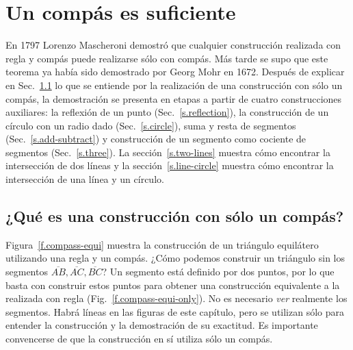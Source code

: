 
\chapter{Un compás es suficiente}\label{c.compass}


En 1797 Lorenzo Mascheroni demostró que cualquier construcción realizada con regla y compás puede realizarse sólo con compás. Más tarde se supo que este teorema ya había sido demostrado por Georg Mohr en 1672.
Después de explicar en Sec.~\ref{s.compass-what} lo que se entiende por la realización de una construcción con sólo un compás, la demostración se presenta en etapas a partir de cuatro construcciones auxiliares: la reflexión de un punto (Sec.~\ref{s.reflection}), la construcción de un círculo con un radio dado (Sec.~\ref{s.circle}), suma y resta de segmentos (Sec.~\ref{s.add-subtract}) y construcción de un segmento como cociente de segmentos (Sec.~\ref{s.three}). La sección~\ref{s.two-lines} muestra cómo encontrar la intersección de dos líneas y la sección~\ref{s.line-circle} muestra cómo encontrar la intersección de una línea y un círculo.

\section{¿Qué es una construcción con sólo un compás?}\label{s.compass-what}

Figura~\ref{f.compass-equi} muestra la construcción de un triángulo equilátero utilizando una regla y un compás. ¿Cómo podemos construir un triángulo sin los segmentos $\overline{AB}, \overline{AC}, \overline{BC}$? Un segmento está definido por dos puntos, por lo que basta con construir estos puntos para obtener una construcción equivalente a la realizada con regla (Fig.~\ref{f.compass-equi-only}). No es necesario \emph{ver} realmente los segmentos.
Habrá líneas en las figuras de este capítulo, pero se utilizan sólo para entender la construcción y la demostración de su exactitud. Es importante convencerse de que la construcción en sí utiliza sólo un compás.


